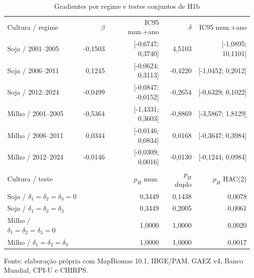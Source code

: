 \begin{table}[htbp]
\centering
\footnotesize
\setlength{\tabcolsep}{3pt}
\renewcommand{\arraystretch}{1.1}
\normalcaption\captionstyle{\centering}
\caption{Gradientes por regime e testes conjuntos de H1b}
\label{tab:h1-regimes-etapa9}
\begin{tabular}{lrrrr}
\hline
Cultura / regime & $\beta$ & IC95 mun.+ano & $\delta$ & IC95 mun.+ano \\
Soja / 2001--2005 & -0,1503 & [-0,6747; 0,3740] & 4,5103 & [-1,0895; 10,1101] \\
Soja / 2006--2011 & 0,1245 & [-0,0624; 0,3113] & -0,4220 & [-1,0452; 0,2012] \\
Soja / 2012--2024 & -0,0499 & [-0,0847; -0,0152] & -0,2654 & [-0,6329; 0,1022] \\
Milho / 2001--2005 & -0,5364 & [-1,4331; 0,3603] & -0,8869 & [-3,5867; 1,8129] \\
Milho / 2006--2011 & 0,0344 & [-0,0146; 0,0834] & 0,0168 & [-0,3647; 0,3984] \\
Milho / 2012--2024 & -0,0146 & [-0,0309; 0,0016] & -0,0130 & [-0,1244; 0,0984] \\
\hline
Cultura / teste &  & $p_H$ mun. & $p_H$ duplo & $p_H$ HAC(2) \\
Soja / $\delta_1=\delta_2=\delta_3=0$ &  & 0,3449 & 0,1438 & 0,0078 \\
Soja / $\delta_1=\delta_2=\delta_3$ &  & 0,3449 & 0,2005 & 0,0061 \\
Milho / $\delta_1=\delta_2=\delta_3=0$ &  & 1,0000 & 1,0000 & 0,0020 \\
Milho / $\delta_1=\delta_2=\delta_3$ &  & 1,0000 & 1,0000 & 0,0017 \\
\hline\end{tabular}
\par\smallskip
\begin{minipage}{\textwidth}\footnotesize\centering
Fonte: elaboração própria com MapBiomas 10.1, IBGE/PAM, GAEZ v4, Banco Mundial, CPI-U e CHIRPS.
\end{minipage}
\end{table}
